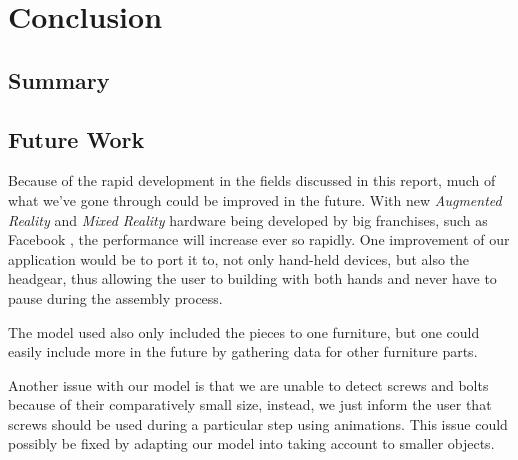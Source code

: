 \section{Conclusion}

\subsection{Summary}

\subsection{Future Work}
Because of the rapid development in the fields discussed in this report, much of what we've gone through could be improved in the future. With new \textit{Augmented Reality} and \textit{Mixed Reality} hardware being developed by big franchises, such as Facebook \cite{facebookAR}, the performance will increase ever so rapidly. 
One improvement of our application would be to port it to, not only hand-held devices, but also the headgear, thus allowing the user to building with both hands and never have to pause during the assembly process. 

The model used also only included the pieces to one furniture, but one could easily include more in the future by gathering data for other furniture parts. 

Another issue with our model is that we are unable to detect screws and bolts because of their comparatively small size, instead, we just inform the user that screws should be used during a particular step using animations. This issue could possibly be fixed by adapting our model into taking account to smaller objects.

\newpage